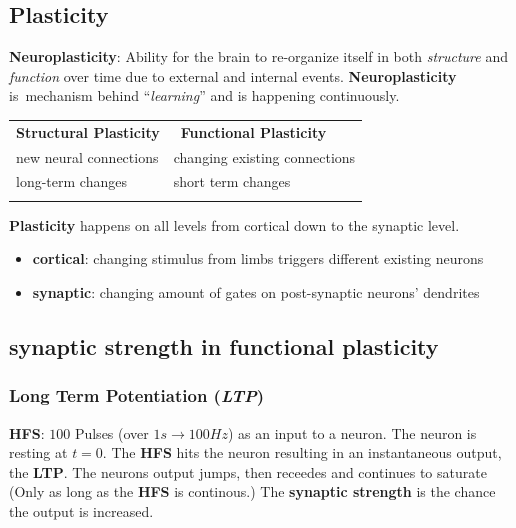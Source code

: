 \documentclass[
    fontsize      = 11pt,
    paper         = a4,
    twoside       = false,
    parskip       = half,
    pagesize      = false,
]{scrartcl}
\providecommand{\tightlist}{%
  \setlength{\itemsep}{0pt}\setlength{\parskip}{0pt}}
\begin{document}
\hypertarget{plasticity}{%
\subsection{Plasticity}\label{plasticity}}

\textbf{Neuroplasticity}: Ability for the brain to re-organize itself in
both \emph{structure} and \emph{function} over time due to external and
internal events. \textbf{Neuroplasticity} is~mechanism behind
``\emph{learning}'' and is happening continuously.

\begin{longtable}[]{@{}ll@{}}
\toprule
\textbf{Structural Plasticity} & ~\textbf{Functional
Plasticity} \\ \addlinespace
\midrule
\endhead
new neural connections & changing existing connections \\ \addlinespace
long-term changes & short term changes \\ \addlinespace
\bottomrule
\end{longtable}

\textbf{Plasticity} happens on all levels from cortical down to the
synaptic level.

\begin{itemize}
\tightlist
\item
  \textbf{cortical}: changing stimulus from limbs triggers different
  existing neurons
\item
  \textbf{synaptic}: changing amount of gates on post-synaptic neurons'
  dendrites
\end{itemize}

\hypertarget{synaptic-strength-in-functional-plasticity}{%
\subsection{\texorpdfstring{\textbf{synaptic strength} in functional
plasticity}{synaptic strength in functional plasticity}}\label{synaptic-strength-in-functional-plasticity}}

\hypertarget{long-term-potentiation-ltp}{%
\subsubsection{\texorpdfstring{Long Term Potentiation
(\emph{LTP})}{Long Term Potentiation (LTP)}}\label{long-term-potentiation-ltp}}

\textbf{HFS}: \(100\) Pulses (over \(1\si{s} \rightarrow 100\si{Hz}\))
as an input to a neuron. The neuron is resting at \(t=0\). The
\textbf{HFS} hits the neuron resulting in an instantaneous output, the
\textbf{LTP}. The neurons output jumps, then receedes and continues to
saturate (Only as long as the \textbf{HFS} is continous.) The
\textbf{synaptic strength} is the chance the output is increased.
\end{document}
